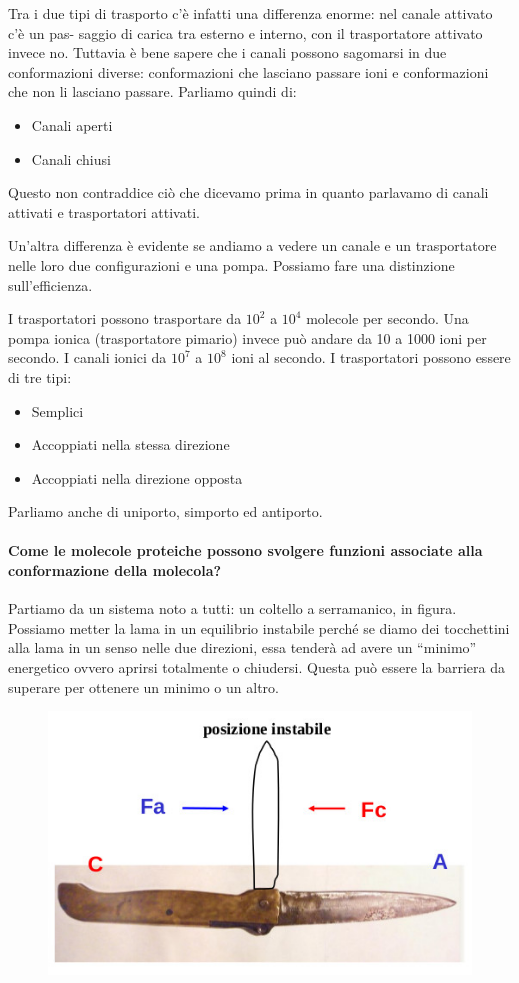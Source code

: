 \documentclass[a4paper,12pt]{article}
\begin{document}
Tra i due tipi di trasporto c’è infatti una differenza enorme: nel canale attivato c'è un pas-
saggio di carica tra esterno e interno, con il trasportatore attivato invece no. Tuttavia è bene sapere che i canali possono sagomarsi in due conformazioni diverse: conformazioni che lasciano passare ioni e conformazioni che non li lasciano passare. Parliamo quindi di:
\begin{itemize}
\item{Canali aperti}
\item{Canali chiusi}
\end{itemize} 
Questo non contraddice ciò che dicevamo
prima in quanto parlavamo di canali attivati e trasportatori attivati.

Un’altra differenza è evidente se andiamo a vedere un canale e un trasportatore nelle loro
due configurazioni e una pompa. Possiamo fare una distinzione sull'efficienza.



I trasportatori possono trasportare da $10^{2}$ a $10^{4}$ molecole per secondo.
Una pompa ionica  (trasportatore pimario) invece può andare da 10 a 1000 ioni per secondo.
I canali ionici da $10^{7}$ a $10^{8}$ ioni al secondo.
I trasportatori possono essere di tre tipi: 
\begin{itemize}
\item{Semplici}
\item{Accoppiati nella stessa direzione}
\item{Accoppiati nella direzione opposta}
\end{itemize}

Parliamo anche di uniporto, simporto ed antiporto.

\paragraph{Come le molecole proteiche possono svolgere funzioni associate alla conformazione della molecola?}

Partiamo da un sistema noto a tutti: un coltello a serramanico, in figura. Possiamo metter la lama in un equilibrio instabile perché se diamo
dei tocchettini alla lama in un senso nelle due
direzioni, essa tenderà ad avere un “minimo”
energetico ovvero aprirsi totalmente o chiudersi. Questa può essere la barriera da superare
per ottenere un minimo o un altro.
\begin{figure}[H]
\centering
\includegraphics[scale=0.6]{immagine/coltello.jpg}
\end{figure}
\end{document}
